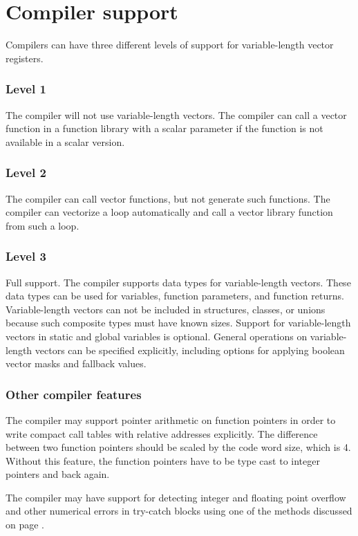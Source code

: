 \documentclass[forwardcom.tex]{subfiles}
\begin{document}
\section{Compiler support} \label{compilerSupport}
Compilers can have three different levels of support for variable-length vector registers. 

\subsubsection{Level 1}
The compiler will not use variable-length vectors. The compiler can call a vector function in a function library with a scalar parameter if the function is not available in a scalar version. 

\subsubsection{Level 2}
The compiler can call vector functions, but not generate such functions. The compiler can vectorize a loop automatically and call a vector library function from such a loop. 

\subsubsection{Level 3}
Full support. The compiler supports data types for variable-length vectors. These data types can be used for variables, function parameters, and function returns. Variable-length vectors can not be included in structures, classes, or unions because such composite types must have known sizes. Support for variable-length vectors in static and global variables is optional.
General operations on variable-length vectors can be specified explicitly, including options for applying boolean vector masks and fallback values.

\subsubsection{Other compiler features}
The compiler may support pointer arithmetic on function pointers in order to write compact call tables with relative addresses explicitly. The difference between two function pointers should be scaled by the code word size, which is 4. Without this feature, the function pointers have to be type cast to integer pointers and back again. 

\vspace{2mm}
The compiler may have support for detecting integer and floating point overflow and other numerical errors in try-catch blocks using one of the methods discussed on page \pageref{integerOverflowDetection}.
\end{document}
